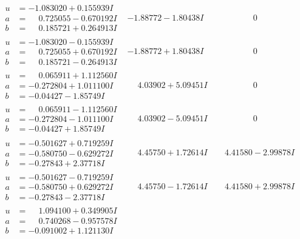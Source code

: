 \documentclass[1p]{elsarticle_modified}
\theoremstyle{definition}
\begin{document}
$$\begin{array}{c|c|c}
\begin{aligned}
u &= -1.083020 + 0.155939 I \\
a &= \phantom{-}0.725055 - 0.670192 I \\
b &= \phantom{-}0.185721 + 0.264913 I\end{aligned}
 & -1.88772 - 1.80438 I & \phantom{-0.000000 } 0 \\ \hline\begin{aligned}
u &= -1.083020 - 0.155939 I \\
a &= \phantom{-}0.725055 + 0.670192 I \\
b &= \phantom{-}0.185721 - 0.264913 I\end{aligned}
 & -1.88772 + 1.80438 I & \phantom{-0.000000 } 0 \\ \hline\begin{aligned}
u &= \phantom{-}0.065911 + 1.112560 I \\
a &= -0.272804 + 1.011100 I \\
b &= -0.04427 - 1.85749 I\end{aligned}
 & \phantom{-}4.03902 + 5.09451 I & \phantom{-0.000000 } 0 \\ \hline\begin{aligned}
u &= \phantom{-}0.065911 - 1.112560 I \\
a &= -0.272804 - 1.011100 I \\
b &= -0.04427 + 1.85749 I\end{aligned}
 & \phantom{-}4.03902 - 5.09451 I & \phantom{-0.000000 } 0 \\ \hline\begin{aligned}
u &= -0.501627 + 0.719259 I \\
a &= -0.580750 - 0.629272 I \\
b &= -0.27843 + 2.37718 I\end{aligned}
 & \phantom{-}4.45750 + 1.72614 I & \phantom{-}4.41580 - 2.99878 I \\ \hline\begin{aligned}
u &= -0.501627 - 0.719259 I \\
a &= -0.580750 + 0.629272 I \\
b &= -0.27843 - 2.37718 I\end{aligned}
 & \phantom{-}4.45750 - 1.72614 I & \phantom{-}4.41580 + 2.99878 I \\ \hline\begin{aligned}
u &= \phantom{-}1.094100 + 0.349905 I \\
a &= \phantom{-}0.740268 - 0.957578 I \\
b &= -0.091002 + 1.121130 I\end{aligned}

\end{array}$$
\end{document}
